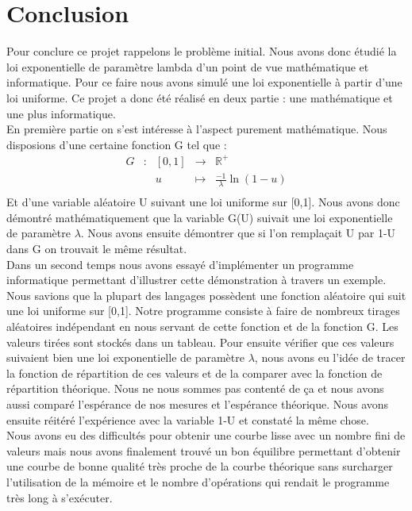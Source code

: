 \documentclass[12,french]{report}
\begin{document}
\chapter*{Conclusion}

Pour conclure ce projet rappelons le problème initial. Nous avons donc étudié la loi exponentielle de paramètre lambda d'un point de vue mathématique et informatique. Pour ce faire nous avons simulé une loi exponentielle à partir d'une loi uniforme. Ce projet a donc été réalisé en deux partie : une mathématique et une plus informatique.\\

En première partie on s'est intéresse à l'aspect purement mathématique. Nous disposions d'une certaine fonction G tel que :
$$\begin{array}{ccccc}
	G & : & [0,1] & \longrightarrow & \mathbb{R}^{+} \\
	& & u & \longmapsto & \frac{-1}{\lambda}\ln(1-u) \\
\end{array}$$ 
Et d'une variable aléatoire U suivant une loi uniforme sur [0,1]. Nous avons donc démontré mathématiquement que la variable G(U) suivait une loi exponentielle de paramètre $\lambda$. Nous avons ensuite démontrer que si l'on remplaçait U par 1-U dans G on trouvait le même résultat.\\

Dans un second temps nous avons essayé d'implémenter un programme informatique permettant d'illustrer cette démonstration à travers un exemple. Nous savions que la plupart des langages possèdent une fonction aléatoire qui suit une loi uniforme sur [0,1]. Notre programme consiste à faire de  nombreux tirages aléatoires indépendant en nous servant de cette fonction et de la fonction G. Les valeurs tirées sont stockés dans un tableau. Pour ensuite vérifier que ces valeurs suivaient bien une loi exponentielle de paramètre $\lambda$, nous avons eu l'idée de tracer la fonction de répartition de ces valeurs et de la comparer avec la fonction de répartition théorique. Nous ne nous sommes pas contenté de ça et nous avons aussi comparé l'espérance de nos mesures et l'espérance théorique. Nous avons ensuite réitéré l'expérience avec la variable 1-U et constaté la même chose.\\

Nous avons eu des difficultés pour obtenir une courbe lisse avec un nombre fini de valeurs mais nous avons finalement trouvé un bon équilibre permettant d'obtenir une courbe de bonne qualité très proche de la courbe théorique sans surcharger l'utilisation de la mémoire et le nombre d'opérations qui rendait le programme très long à s'exécuter.\\
\end{document}
